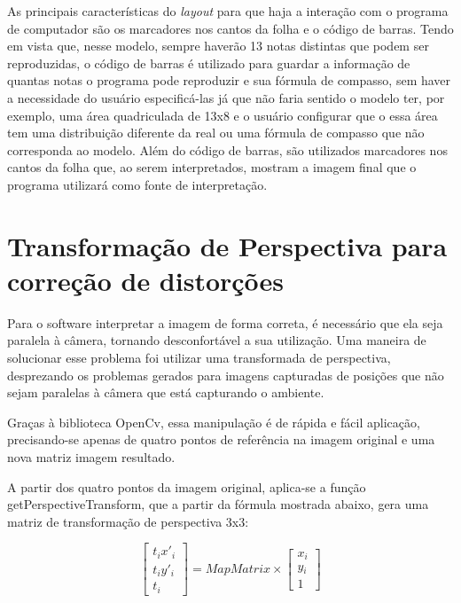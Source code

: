 \documentclass[12pt]{report}
\begin{document}
{As principais características do {\it layout} para que haja a
interação com o programa de computador são os marcadores nos cantos da
folha e o código de barras. Tendo em vista que, nesse modelo, sempre
haverão 13 notas distintas que podem ser reproduzidas, o código de
barras é utilizado para guardar a informação de quantas notas o
programa pode reproduzir e sua fórmula de compasso, sem haver a
necessidade do usuário especificá-las já que não faria sentido o
modelo ter, por exemplo, uma área quadriculada de 13x8 e o usuário
configurar que o essa área tem uma distribuição diferente da real ou
uma fórmula de compasso que não corresponda ao modelo. Além do código
de barras, são utilizados marcadores nos cantos da folha que, ao serem
interpretados, mostram a imagem final que o programa utilizará como
fonte de interpretação.

\section{Transformação de Perspectiva para correção de distorções}
\label{sec:perspectiva}

Para o software interpretar a imagem de forma correta, é necessário que ela seja paralela à câmera, tornando desconfortável a sua utilização. Uma maneira de solucionar esse problema foi utilizar uma transformada de perspectiva, desprezando os problemas gerados para imagens capturadas de posições que não sejam paralelas à câmera que está capturando o ambiente.

Graças à biblioteca OpenCv, essa manipulação é de rápida e fácil aplicação, precisando-se apenas de quatro pontos de referência na imagem original e uma nova matriz imagem resultado.

A partir dos quatro pontos da imagem original, aplica-se a função getPerspectiveTransform, que a partir da fórmula mostrada abaixo, gera uma matriz de transformação de perspectiva 3x3:

\begin{equation}
  \begin{bmatrix}
    t{}_i x'{}_i \\
    t{}_i y'{}_i \\
    t{}_i
  \end{bmatrix} = MapMatrix \times
  \begin{bmatrix}
    x{}_i \\
    y{}_i \\
    1
  \end{bmatrix}
\end{equation}

}
\end{document}
